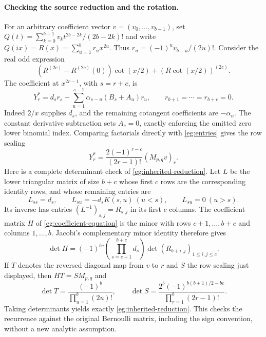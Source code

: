 \paragraph{Checking the source reduction and the rotation.}
For an arbitrary coefficient vector $v=(v_0,\ldots,v_{b-1})$, set
$Q(t)=\sum_{k=0}^{b-1}v_k t^{2b-2k}/(2b-2k)!$ and write
$Q(ix)=R(x)=\sum_{u=1}^b r_ux^{2u}$. Thus
$r_u=(-1)^uv_{b-u}/(2u)!$. Consider the real odd expression
\[
 (R^{(2c)}-R^{(2c)}(0))\cot(x/2)+(R\cot(x/2))^{(2c)}.
\]
The coefficient at $x^{2r-1}$, with $s=r+c$, is
\begin{equation}\label{eg:coefficient-equation}
 Y_r^*=d_sr_s-\sum_{u=1}^{s-1}\alpha_{s-u}(B_s+A_u)r_u,
 \qquad r_{b+1}=\cdots=r_{b+c}=0.
\end{equation}
Indeed $2/x$ supplies $d_s$, and the remaining cotangent coefficients
are $-\alpha_n$. The constant derivative subtraction sets $A_c=0$,
exactly enforcing the omitted zero lower binomial index.
Comparing factorials directly with \eqref{eg:entries} gives the row scaling
\[
 Y_r^*=\frac{2(-1)^{r-c}}{(2r-1)!}(M_{p,q}v)_r.
\]
Here is a complete determinant check of
\eqref{eg:inherited-reduction}. Let $L$ be the lower triangular
matrix of size $b+c$ whose first $c$ rows are the corresponding
identity rows, and whose remaining entries are
\[
 L_{ss}=d_s,\qquad L_{su}=-d_sK(s,u)\ (u<s),\qquad
 L_{su}=0\ (u>s).
\]
Its inverse has entries $(L^{-1})_{s,j}=R_{s,j}$ in its first $c$
columns. The coefficient matrix $H$ of
\eqref{eg:coefficient-equation} is the minor with rows
$c+1,\ldots,b+c$ and columns $1,\ldots,b$. Jacobi's complementary
minor identity therefore gives
\[
 \det H=(-1)^{bc}\left(\prod_{s=c+1}^{b+c}d_s\right)
                     \det(R_{b+i,j})_{1\le i,j\le c}.
\]
If $T$ denotes the reversed diagonal map from $v$ to $r$ and $S$
the row scaling just displayed, then $HT=SM_{p,q}$ and
\[
 \det T=\frac{(-1)^b}{\prod_{u=1}^b(2u)!},\qquad
 \det S=\frac{2^b(-1)^{b(b+1)/2-bc}}
                       {\prod_{r=1}^b(2r-1)!}.
\]
Taking determinants yields exactly
\eqref{eg:inherited-reduction}. This checks the recurrence against
the original Bernoulli matrix, including the sign convention, without
a new analytic assumption.

